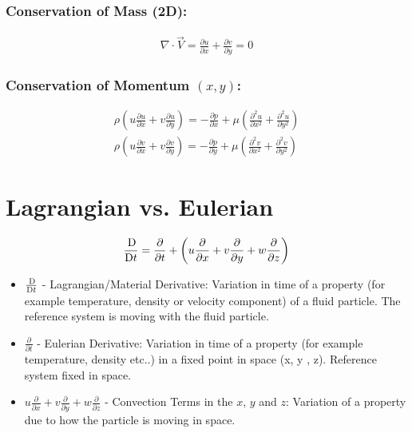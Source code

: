 \documentclass[class=report, crop=false, 12pt,a4paper]{standalone}
\begin{document}
\subsubsection{Conservation of Mass (2D):}
\begin{gather}
  \nabla \cdot \vec{V} = \frac{\partial u}{\partial x} + \frac{\partial v}{\partial y} = 0
\end{gather}
\subsubsection{Conservation of Momentum $(x,y)$:}
\begin{gather}
  \rho \left(u\frac{\partial u}{\partial x} + v\frac{\partial u}{\partial y} \right) = -\frac{\partial p}{\partial x} + \mu \left(\frac{\partial^2 u}{\partial x^2} + \frac{\partial^2 u}{\partial y^2} \right) \\
  \rho \left(u\frac{\partial v}{\partial x} + v\frac{\partial v}{\partial y} \right) = -\frac{\partial p}{\partial y} + \mu \left(\frac{\partial^2 v}{\partial x^2} + \frac{\partial^2 v}{\partial y^2} \right) 
\end{gather}
\section{Lagrangian vs. Eulerian}
\begin{gather}
  \frac{\Dif}{\Dif t} = \frac{\partial}{\partial t} + \left(u\frac{\partial}{\partial x} + v\frac{\partial}{\partial y} + w\frac{\partial}{\partial z} \right)
\end{gather}
\begin{itemize}
  \item $\frac{\Dif}{\Dif t}$ - Lagrangian/Material Derivative: Variation in time of a property (for example temperature, density or velocity component) of a fluid particle. The reference system is moving with the fluid particle. 
  \item $\frac{\partial}{\partial t}$ - Eulerian Derivative: Variation in time of a property (for example temperature, density etc..) in a fixed point in space (x, y , z). Reference system fixed in space. 
  \item $u\frac{\partial}{\partial x} + v\frac{\partial}{\partial y} + w\frac{\partial}{\partial z}$ - Convection Terms in the $x$, $y$ and $z$: Variation of a property due to how the particle is moving in space.
\end{itemize}
\end{document}
